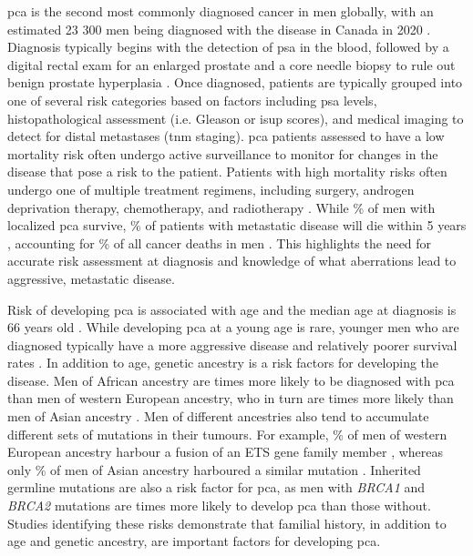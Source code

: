 \Gls{pca} is the second most commonly diagnosed cancer in men globally, with an estimated 23 300 men being diagnosed with the disease in Canada in 2020 \cite{brayGlobalCancerStatistics2018,brennerProjectedEstimatesCancer2020}.
Diagnosis typically begins with the detection of \gls{psa} in the blood, followed by a digital rectal exam for an enlarged prostate and a core needle biopsy to rule out benign prostate hyperplasia \cite{rebelloProstateCancer2021}.
Once diagnosed, patients are typically grouped into one of several risk categories based on factors including \gls{psa} levels, histopathological assessment (i.e. Gleason or \gls{isup} scores), and medical imaging to detect for distal metastases (\gls{tnm} staging)\cite{rebelloProstateCancer2021}.
\Gls{pca} patients assessed to have a low mortality risk often undergo active surveillance to monitor for changes in the disease that pose a risk to the patient.
Patients with high mortality risks often undergo one of multiple treatment regimens, including surgery, androgen deprivation therapy, chemotherapy, and radiotherapy \cite{rebelloProstateCancer2021}.
While  \% of men with localized \gls{pca} survive,  \% of patients with metastatic disease will die within 5 years \cite{hahnMetastaticCastrationSensitiveProstate2018,SEERProstateCancer}, accounting for  \% of all cancer deaths in men \cite{brennerProjectedEstimatesCancer2020}.
This highlights the need for accurate risk assessment at diagnosis and knowledge of what aberrations lead to aggressive, metastatic disease.

Risk of developing \gls{pca} is associated with age and the median age at diagnosis is 66 years old \cite{rawlaEpidemiologyProstateCancer2019}.
While developing \gls{pca} at a young age is rare, younger men who are diagnosed typically have a more aggressive disease and relatively poorer survival rates \cite{SEERProstateCancer}.
In addition to age, genetic ancestry is a risk factors for developing the disease.
Men of African ancestry are  times more likely to be diagnosed with \gls{pca} than men of western European ancestry, who in turn are  times more likely than men of Asian ancestry \cite{SEERProstateCancer,smithAfricanAmericanProstateCancer2017,dalleraChangingIncidenceMetastatic2019}.
Men of different ancestries also tend to accumulate different sets of mutations in their tumours.
For example,  \% of men of western European ancestry harbour a fusion of an ETS gene family member \cite{fraserGenomicHallmarksLocalized2017}, whereas only  \% of men of Asian ancestry harboured a similar mutation \cite{liGenomicEpigenomicAtlas2020}.
Inherited germline mutations are also a risk factor for \gls{pca}, as men with \emph{BRCA1} and \emph{BRCA2} mutations are  times more likely to develop \gls{pca} than those without.
Studies identifying these risks demonstrate that familial history, in addition to age and genetic ancestry, are important factors for developing \gls{pca}.

